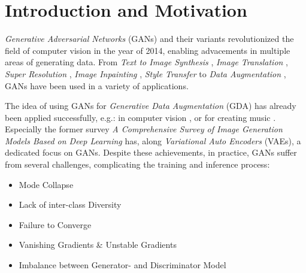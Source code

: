 \section{Introduction and Motivation}\label{introduction_and_motivation}
\pagestyle{fancy}
\textit{Generative Adversarial Networks} (GANs) \cite{goodfellow2014generativeadversarialnetworks} and their variants revolutionized the field of computer vision in the year of 2014, enabling advacements in multiple areas of generating data. From \textit{Text to Image Synthesis} \cite{reed2016generativeadversarialtextimage}, \textit{Image Translation} \cite{isola2018imagetoimagetranslationconditionaladversarial}, \textit{Super Resolution} \cite{ledig2017photorealisticsingleimagesuperresolution}, \textit{Image Inpainting} \cite{pathak2016contextencodersfeaturelearning}, \textit{Style Transfer} \cite{wang2023multimodalityguidedimagestyletransfer} to \textit{Data Augmentation} \cite{shorten2019survey}, GANs have been used in a variety of applications.

The idea of using GANs for \textit{Generative Data Augmentation} (GDA) has already been applied successfully, e.g.: in computer vision \cite{Li2025comprehensivesurvedeepimages}, \cite{biswas2023generativeadversarialnetworksdata} or for creating music \cite{ji2020comprehensivesurveydeepmusic}. Especially the former survey \textit{A Comprehensive Survey of Image Generation Models Based on Deep Learning} has, along \textit{Variational Auto Encoders} (VAEs), a dedicated focus on GANs. Despite these achievements, in practice, GANs suffer from several challenges, complicating the training and inference process:

\begin{itemize}\label{problems_of_gans}
    \setlength{\itemsep}{-5pt}
    \item Mode Collapse
    \item Lack of inter-class Diversity
    \item Failure to Converge
    \item Vanishing Gradients \& Unstable Gradients
    \item Imbalance between Generator- and Discriminator Model
\end{itemize}

